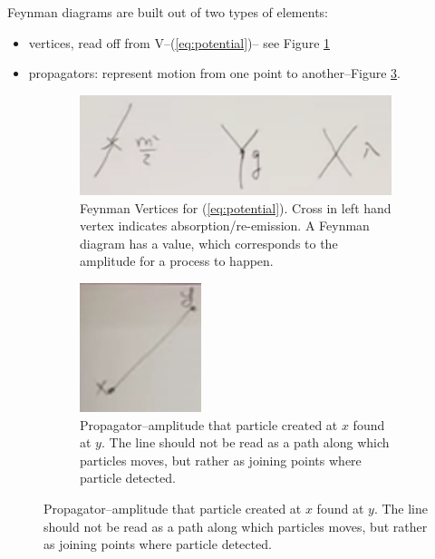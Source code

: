 \documentclass[]{article}
\begin{document}
Feynman diagrams are built out of two types of elements:
\begin{itemize}
	\item vertices, read off from V--(\ref{eq:potential})-- see Figure \ref{fig:3-1-feynman-vertices}
	\item propagators: represent motion from one point to another--Figure \ref{fig:3-1-feynman-propagator}.
\end{itemize}

\begin{figure}[H]
	\begin{center}
		\caption{Elements of a Feynman diagram}
		\begin{subfigure}[t]{0.45\textwidth}
			\caption{Feynman Vertices for (\ref{eq:potential}). Cross in left hand vertex indicates absorption/re-emission. A Feynman diagram has a value, which corresponds to the amplitude for a process to happen.}\label{fig:3-1-feynman-vertices}
			\includegraphics[width=\textwidth]{3-1-feynman-vertices}
		\end{subfigure}
		\begin{subfigure}[t]{0.45\textwidth}
			\caption{Propagator--amplitude that particle created at $x$ found at $y$. The line should not be read as a path along which particles moves, but rather as joining points where particle detected.}\label{fig:3-1-feynman-propagator}
			\includegraphics[width=\textwidth]{3-1-feynman-propagator}
		\end{subfigure}
	\end{center}
\end{figure}
\end{document}
